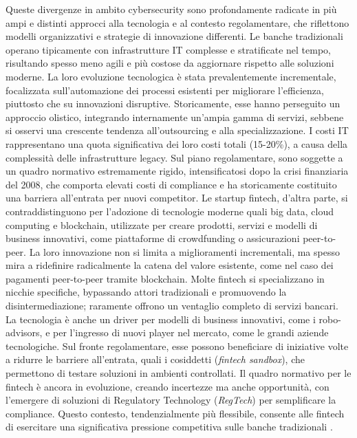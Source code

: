 Queste divergenze in ambito cybersecurity sono profondamente radicate in più ampi e distinti approcci alla tecnologia e al contesto regolamentare, che riflettono modelli organizzativi e strategie di innovazione differenti.
Le banche tradizionali operano tipicamente con infrastrutture IT complesse e stratificate nel tempo, risultando spesso meno agili e più costose da aggiornare rispetto alle soluzioni moderne. La loro evoluzione tecnologica è stata prevalentemente incrementale, focalizzata sull'automazione dei processi esistenti per migliorare l'efficienza, piuttosto che su innovazioni disruptive. Storicamente, esse hanno perseguito un approccio olistico, integrando internamente un'ampia gamma di servizi, sebbene si osservi una crescente tendenza all'outsourcing e alla specializzazione. I costi IT rappresentano una quota significativa dei loro costi totali (15-20\%), a causa della complessità delle infrastrutture legacy. Sul piano regolamentare, sono soggette a un quadro normativo estremamente rigido, intensificatosi dopo la crisi finanziaria del 2008, che comporta elevati costi di compliance e ha storicamente costituito una barriera all'entrata per nuovi competitor.
Le startup fintech, d'altra parte, si contraddistinguono per l'adozione di tecnologie moderne quali big data, cloud computing e blockchain, utilizzate per creare prodotti, servizi e modelli di business innovativi, come piattaforme di crowdfunding o assicurazioni peer-to-peer. La loro innovazione non si limita a miglioramenti incrementali, ma spesso mira a ridefinire radicalmente la catena del valore esistente, come nel caso dei pagamenti peer-to-peer tramite blockchain. Molte fintech si specializzano in nicchie specifiche, bypassando attori tradizionali e promuovendo la disintermediazione; raramente offrono un ventaglio completo di servizi bancari. La tecnologia è anche un driver per modelli di business innovativi, come i robo-advisors, e per l'ingresso di nuovi player nel mercato, come le grandi aziende tecnologiche. Sul fronte regolamentare, esse possono beneficiare di iniziative volte a ridurre le barriere all'entrata, quali i cosiddetti (\textit{fintech sandbox}), che permettono di testare soluzioni in ambienti controllati. Il quadro normativo per le fintech è ancora in evoluzione, creando incertezze ma anche opportunità, con l'emergere di soluzioni di Regulatory Technology (\textit{RegTech}) per semplificare la compliance. Questo contesto, tendenzialmente più flessibile, consente alle fintech di esercitare una significativa pressione competitiva sulle banche tradizionali \cite{puschmann_fintech_2017}.

